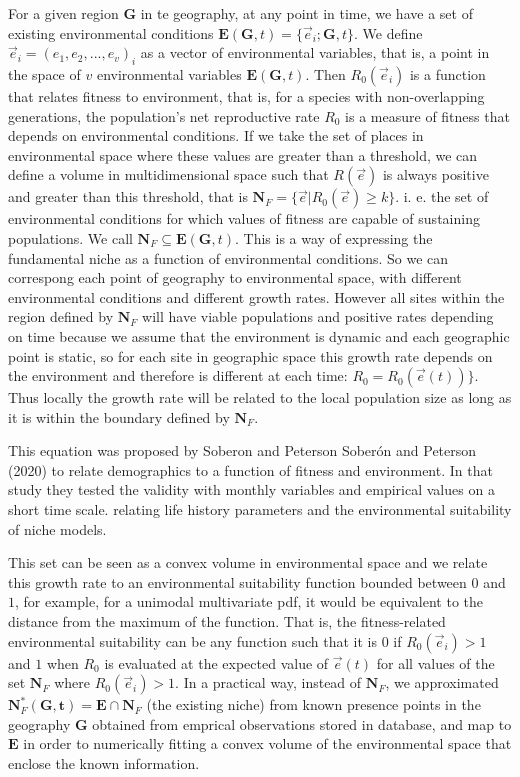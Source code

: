 \documentclass[
]{article}
\begin{document}
For a given region \(\mathbf{G}\) in te geography, at any point in time,
we have a set of existing environmental conditions
\(\mathbf{E}(\mathbf{G}, t) = \Big \{ \vec{e}_i; \mathbf{G}, t\Big \}\).
We define \(\vec{e}_i =(e_1, e_2, ..., e_v )_i\) as a vector of
environmental variables, that is, a point in the space of \(v\)
environmental variables \(\mathbf{E}(\mathbf{G}, t)\). Then
\(R_0(\vec{e}_i)\) is a function that relates fitness to environment,
that is, for a species with non-overlapping generations, the
population's net reproductive rate \(R_0\) is a measure of fitness that
depends on environmental conditions. If we take the set of places in
environmental space where these values are greater than a threshold, we
can define a volume in multidimensional space such that \(R(\vec{e})\)
is always positive and greater than this threshold, that is
\(\mathbf{N}_F=\{\vec{e} | R_0(\vec{e}) \ge k \}\). i. e. the set of
environmental conditions for which values of fitness are capable of
sustaining populations. We call
\(\mathbf{N}_F \subseteq \mathbf{E}(\mathbf{G}, t)\). This is a way of
expressing the fundamental niche as a function of environmental
conditions. So we can correspong each point of geography to
environmental space, with different environmental conditions and
different growth rates. However all sites within the region defined by
\(\mathbf{N}_F\) will have viable populations and positive rates
depending on time because we assume that the environment is dynamic and
each geographic point is static, so for each site in geographic space
this growth rate depends on the environment and therefore is different
at each time: \(R_0 = R_0(\vec{e}(t)) \}\). Thus locally the growth rate
will be related to the local population size as long as it is within the
boundary defined by \(\mathbf{N}_F\).

This equation was proposed by Soberon and Peterson Soberón and Peterson
(2020) to relate demographics to a function of fitness and environment.
In that study they tested the validity with monthly variables and
empirical values on a short time scale. relating life history parameters
and the environmental suitability of niche models.

This set can be seen as a convex volume in environmental space and we
relate this growth rate to an environmental suitability function bounded
between \(0\) and \(1\), for example, for a unimodal multivariate pdf,
it would be equivalent to the distance from the maximum of the function.
That is, the fitness-related environmental suitability can be any
function such that it is \(0\) if \(R_0(\vec{e}_i) > 1\) and \(1\) when
\(R_0\) is evaluated at the expected value of \(\vec {e}(t)\) for all
values of the set \(\mathbf{N}_F\) where \(R_0(\vec{e}_i) > 1\). In a
practical way, instead of \(\mathbf{N}_F\), we approximated
\(\mathbf{N}_F^{*}(\mathbf{G, t}) = \mathbf{E} \cap \mathbf{N}_F\) (the
existing niche) from known presence points in the geography
\(\mathbf{G}\) obtained from emprical observations stored in database,
and map to \(\mathbf{E}\) in order to numerically fitting a convex
volume of the environmental space that enclose the known information.
\end{document}
